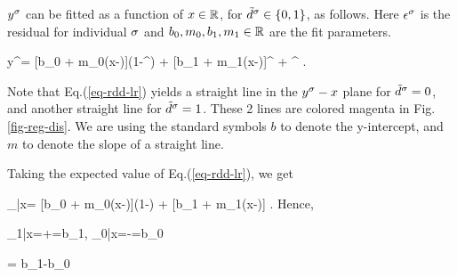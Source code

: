 $y^\sigma$
can be fitted
as a function of $x\in { \mathbb{R}}$,
for ${\tilde{d}}^\sigma \in \{0,1\}$,
 as follows.
Here $\epsilon^\sigma$
is the residual
for individual $\sigma$
and $b_0, m_0, b_1, m_1\in { \mathbb{R}}$
are the fit parameters.

\beq
y^\s = [b_0 + m_0(x-\xi)](1-\td^\s)
+  [b_1 + m_1(x-\xi)]\td^\s
+ \eps^\s
\;.
\label{eq-rdd-lr}
\eeq

Note that Eq.(\ref{eq-rdd-lr})
 yields a straight line
in the $y^\sigma-x$ plane
for ${\tilde{d}}^\sigma=0$,
and another 
straight line for ${\tilde{d}}^\sigma=1$.
These 2 lines are 
colored magenta in Fig.\ref{fig-reg-dis}.
We are
using the
standard symbols
$b$ to denote
the y-intercept, and $m$ 
to denote the slope
of a straight line.

Taking the expected value
of Eq.(\ref{eq-rdd-lr}), we get

\beq
\caly_{\td|x}=
[b_0 + m_0(x-\xi)](1-\td)
+  [b_1 + m_1(x-\xi)]\td
\;.
\eeq
Hence,

\beq
\caly_{1|x=\xi+}=b_1\;,\;\;
\caly_{0|x=\xi-}=b_0
\eeq

\beq
\delta= b_1-b_0
\eeq

